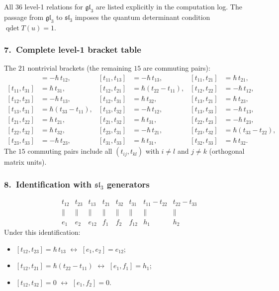 \noindent
All $36$ level-1 relations for $\mathfrak{gl}_3$ are listed
explicitly in the computation log.  The passage from
$\mathfrak{gl}_3$ to $\mathfrak{sl}_3$ imposes the quantum
determinant condition $\operatorname{qdet} T(u) = 1$.

\subsubsection*{7.\ Complete level-1 bracket table}

The $21$ nontrivial brackets (the remaining $15$ are commuting pairs):
\begin{align*}
[t_{11}, t_{12}] &= -\hbar\,t_{12},
&[t_{11}, t_{13}] &= -\hbar\,t_{13},
&[t_{11}, t_{21}] &= \hbar\,t_{21}, \\
[t_{11}, t_{31}] &= \hbar\,t_{31},
&[t_{12}, t_{21}] &= \hbar(t_{22} - t_{11}),
&[t_{12}, t_{22}] &= -\hbar\,t_{12}, \\
[t_{12}, t_{23}] &= -\hbar\,t_{13},
&[t_{12}, t_{31}] &= \hbar\,t_{32},
&[t_{13}, t_{21}] &= \hbar\,t_{23}, \\
[t_{13}, t_{31}] &= \hbar(t_{33} - t_{11}),
&[t_{13}, t_{32}] &= -\hbar\,t_{12},
&[t_{13}, t_{33}] &= -\hbar\,t_{13}, \\
[t_{21}, t_{22}] &= \hbar\,t_{21},
&[t_{21}, t_{32}] &= \hbar\,t_{31},
&[t_{22}, t_{23}] &= -\hbar\,t_{23}, \\
[t_{22}, t_{32}] &= \hbar\,t_{32},
&[t_{23}, t_{31}] &= -\hbar\,t_{21},
&[t_{23}, t_{32}] &= \hbar(t_{33} - t_{22}), \\
[t_{23}, t_{33}] &= -\hbar\,t_{23},
&[t_{31}, t_{33}] &= \hbar\,t_{31},
&[t_{32}, t_{33}] &= \hbar\,t_{32}.
\end{align*}
The $15$ commuting pairs include all $(t_{ij}, t_{kl})$ with
$i \ne l$ and $j \ne k$ (orthogonal matrix units).

\subsubsection*{8.\ Identification with $\mathfrak{sl}_3$ generators}

\[
\begin{array}{cccccccc}
t_{12} & t_{23} & t_{13} & t_{21} & t_{32} & t_{31}
  & t_{11}{-}t_{22} & t_{22}{-}t_{33} \\
\| & \| & \| & \| & \| & \| & \| & \| \\
e_1 & e_2 & e_{12} & f_1 & f_2 & f_{12} & h_1 & h_2
\end{array}
\]
Under this identification:
\begin{itemize}
\item $[t_{12}, t_{23}] = \hbar\,t_{13}$ $\longleftrightarrow$
  $[e_1, e_2] = e_{12}$;
\item $[t_{12}, t_{21}] = \hbar(t_{22} - t_{11})$ $\longleftrightarrow$
  $[e_1, f_1] = h_1$;
\item $[t_{12}, t_{32}] = 0$ $\longleftrightarrow$
  $[e_1, f_2] = 0$.
\end{itemize}

